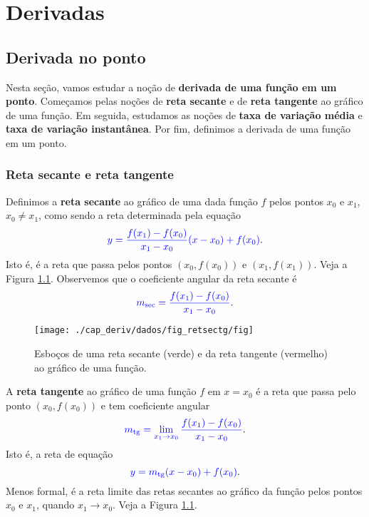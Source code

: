 \chapter{Derivadas}\label{cap_deriv}

\section{Derivada no ponto}\label{cap_deriv_sec_derivpt}

Nesta seção, vamos estudar a noção de {\bf derivada de uma função em um ponto}. Começamos pelas noções de {\bf reta secante} e de {\bf reta tangente} ao gráfico de uma função. Em seguida, estudamos as noções de {\bf taxa de variação média} e {\bf taxa de variação instantânea}. Por fim, definimos a derivada de uma função em um ponto.

\subsection{Reta secante e reta tangente}

Definimos a {\bf reta secante} ao gráfico de uma dada função $f$ pelos pontos $x_0$ e $x_1$, $x_0\neq x_1$, como sendo a reta determinada pela equação
\begin{equation}
  {\color{blue}y = \frac{f(x_1)-f(x_0)}{x_1-x_0}(x-x_0)+f(x_0)}.
\end{equation}
Isto é, é a reta que passa pelos pontos $(x_0,f(x_0))$ e $(x_1,f(x_1))$. Veja a Figura \ref{fig:retsectg}. Observemos que o coeficiente angular da reta secante é
\begin{equation}
  {\color{blue}m_{\text{sec}} = \frac{f(x_1)-f(x_0)}{x_1-x_0}}.
\end{equation}

\begin{figure}[H]
  \centering
  \texttt{[image: ./cap\_deriv/dados/fig\_retsectg/fig]}
  \caption{Esboços de uma reta secante (verde) e da reta tangente (vermelho) ao gráfico de uma função.}
  \label{fig:retsectg}
\end{figure}

A {\bf reta tangente} ao gráfico de uma função $f$ em $x=x_0$ é a reta que passa pelo ponto $(x_0, f(x_0))$ e tem coeficiente angular
\begin{equation}\label{eq:mtg}
  {\color{blue}m_{\text{tg}} = \lim_{x_1\to x_0} \frac{f(x_1)-f(x_0)}{x_1-x_0}}.
\end{equation}
Isto é, a reta de equação
\begin{equation}
  {\color{blue}y = m_{\text{tg}}(x-x_0)+f(x_0)}.
\end{equation}
Menos formal, é a reta limite das retas secantes ao gráfico da função pelos pontos $x_0$ e $x_1$, quando $x_1\to x_0$. Veja a Figura \ref{fig:retsectg}.

